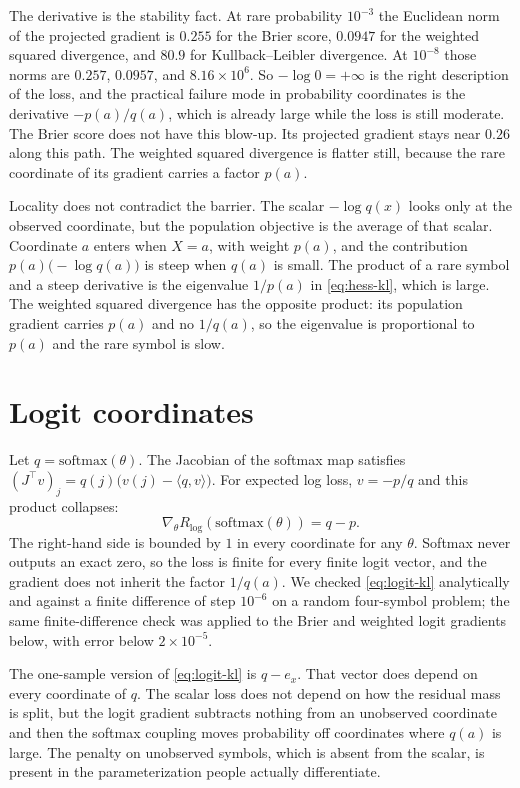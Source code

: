 \documentclass[10pt]{article}
\begin{document}
The derivative is the stability fact.
At rare probability $10^{-3}$ the Euclidean norm of the projected gradient is $0.255$ for the Brier score, $0.0947$ for the weighted squared divergence, and $80.9$ for Kullback--Leibler divergence.
At $10^{-8}$ those norms are $0.257$, $0.0957$, and $8.16\times 10^{6}$.
So $-\log 0=+\infty$ is the right description of the loss, and the practical failure mode in probability coordinates is the derivative $-p(a)/q(a)$, which is already large while the loss is still moderate.
The Brier score does not have this blow-up.
Its projected gradient stays near $0.26$ along this path.
The weighted squared divergence is flatter still, because the rare coordinate of its gradient carries a factor $p(a)$.

Locality does not contradict the barrier.
The scalar $-\log q(x)$ looks only at the observed coordinate, but the population objective is the average of that scalar.
Coordinate $a$ enters when $X=a$, with weight $p(a)$, and the contribution $p(a)\bigl(-\log q(a)\bigr)$ is steep when $q(a)$ is small.
The product of a rare symbol and a steep derivative is the eigenvalue $1/p(a)$ in \eqref{eq:hess-kl}, which is large.
The weighted squared divergence has the opposite product: its population gradient carries $p(a)$ and no $1/q(a)$, so the eigenvalue is proportional to $p(a)$ and the rare symbol is slow.

\section{Logit coordinates}
\label{sec:logits}

Let $q=\mathrm{softmax}(\theta)$.
The Jacobian of the softmax map satisfies $(J^\top v)_j = q(j)\bigl(v(j)-\langle q,v\rangle\bigr)$.
For expected log loss, $v=-p/q$ and this product collapses:
\begin{equation}
\label{eq:logit-kl}
\nabla_\theta R_{\log}(\mathrm{softmax}(\theta)) = q-p.
\end{equation}
The right-hand side is bounded by $1$ in every coordinate for any $\theta$.
Softmax never outputs an exact zero, so the loss is finite for every finite logit vector, and the gradient does not inherit the factor $1/q(a)$.
We checked \eqref{eq:logit-kl} analytically and against a finite difference of step $10^{-6}$ on a random four-symbol problem; the same finite-difference check was applied to the Brier and weighted logit gradients below, with error below $2\times 10^{-5}$.

The one-sample version of \eqref{eq:logit-kl} is $q-e_x$.
That vector does depend on every coordinate of $q$.
The scalar loss does not depend on how the residual mass is split, but the logit gradient subtracts nothing from an unobserved coordinate and then the softmax coupling moves probability off coordinates where $q(a)$ is large.
The penalty on unobserved symbols, which is absent from the scalar, is present in the parameterization people actually differentiate.
\end{document}
